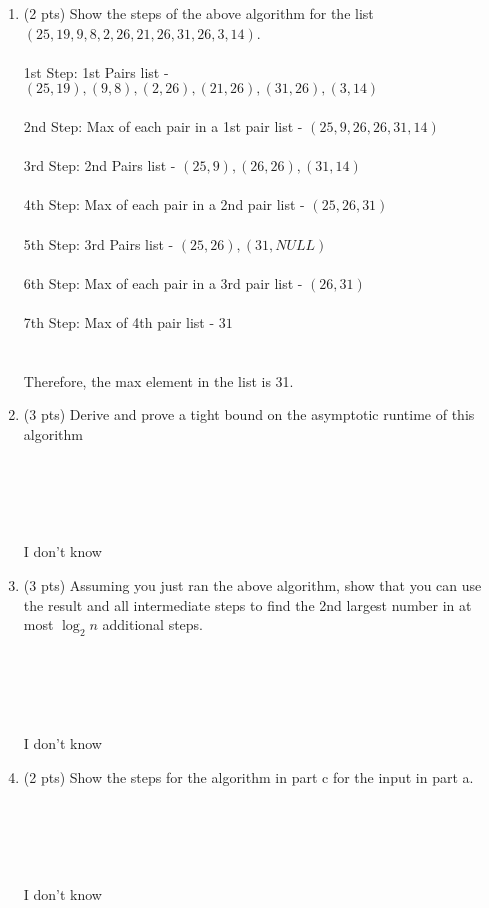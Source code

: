 \documentclass[12pt]{article}
\begin{document}
\begin{enumerate}
\begin{enumerate}
    \item \label{2a} (2 pts) Show the steps of the above algorithm for the list $(25, 19, 9, 8, 2, 26, 21, 26, 31, 26, 3, 14)$.
    \\ \\ 1st Step: 1st Pairs list - $(25,19), (9,8), (2,26), (21,26), (31,26), (3, 14)$ \\ \\ 2nd Step: Max of each pair in a 1st pair list - $(25, 9, 26, 26, 31, 14)$ \\ \\ 3rd Step: 2nd Pairs list - $(25, 9), (26, 26), (31, 14)$ \\ \\ 4th Step: Max of each pair in a 2nd pair list - $(25, 26, 31)$ \\ \\ 5th Step: 3rd Pairs list - $(25,26) , (31,NULL)$ \\ \\ 6th Step: Max of each pair in a 3rd pair list - $(26, 31)$ \\ \\ 7th Step: Max of 4th pair list - $31$ \\ \\ \\ Therefore, the max element in the list is 31.
    \pagebreak	
    \item \label{2b} (3 pts) Derive and prove a tight bound on the asymptotic runtime of this algorithm
        \\ \\ \\ \\ \\ \\ I don't know
    \pagebreak	
    \item \label{2c} (3 pts) Assuming you just ran the above algorithm, show that you can
    use the result and all intermediate steps to find the 2nd largest number in
    at most $\log_{2}n$ additional steps.
    \\ \\ \\ \\ \\ \\ I don't know
    \pagebreak	
    \item \label{2d} (2 pts) Show the steps for the algorithm in part c for the input in
    part a.
    \\ \\ \\ \\ \\ \\ I don't know
    \pagebreak	
\end{enumerate}


\end{enumerate}
\end{document}
